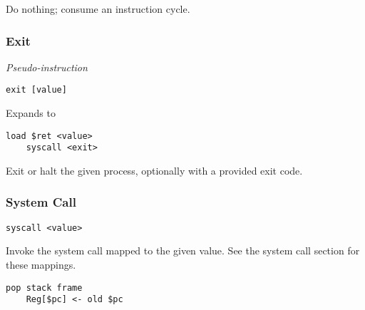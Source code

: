 Do nothing; consume an instruction cycle.

\subsubsection{Exit}

\textit{Pseudo-instruction}

\begin{lstlisting}[style=assembly]
    exit [value]
\end{lstlisting}

Expands to

\begin{lstlisting}[style=assembly]
    load $ret <value>
    syscall <exit>
\end{lstlisting}

Exit or halt the given process, optionally with a provided exit code.

\subsubsection{System Call}

\begin{lstlisting}[style=assembly]
    syscall <value>
\end{lstlisting}

Invoke the system call mapped to the given value.
See the system call section for these mappings.

\begin{lstlisting}[style=rtn]
    pop stack frame
    Reg[$pc] <- old $pc
\end{lstlisting}
